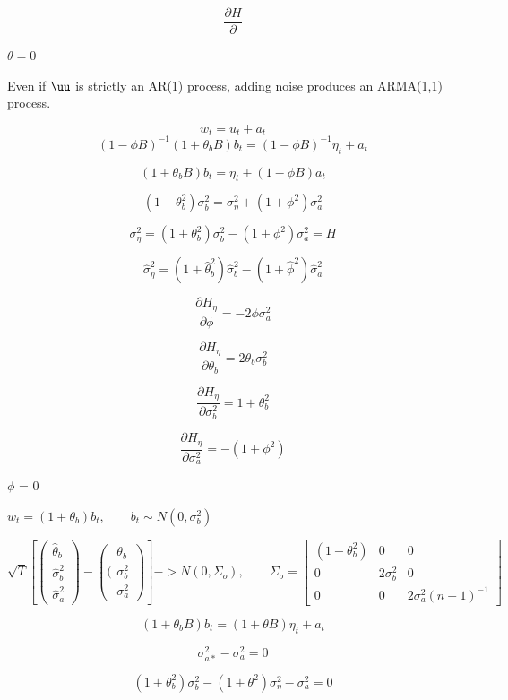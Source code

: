 $$\frac{\partial H}{\partial }$$


{$\theta = 0$}

Even if $\uu$ is strictly an AR(1) process, adding noise produces an ARMA(1,1) process. 

$$ w_t = u_t + a_t $$
$$ (1 - \phi B)^{-1}(1 + \theta_bB)b_t = (1 - \phi B)^{-1} \eta_t + a_t $$

$$ (1 + \theta_bB)b_t = \eta_t + (1 - \phi B)a_t $$

$$ (1 + \theta_b^2)\sigma_b^2 = \sigma_\eta^2 + (1 + \phi^2)\sigma_a^2 $$

$$ {\sigma}_\eta^2 = (1 + {\theta}_b^2){\sigma}_b^2 - (1 + {\phi}^2){\sigma}_a^2 = H $$

$$ \hat{\sigma}_\eta^2 = (1 + \hat{\theta}_b^2)\hat{\sigma}_b^2 - (1 + \hat{\phi}^2)\hat{\sigma}_a^2 $$

$$ \frac{\partial H_\eta}{\partial \phi} = -2\phi\sigma_a^2$$

$$ \frac{\partial H_\eta}{\partial \theta_b} = 2\theta_b\sigma_b^2$$

$$ \frac{\partial H_\eta}{\partial \sigma_b^2} = 1 + \theta_b^2$$

$$ \frac{\partial H_\eta}{\partial \sigma_a^2} = -(1 + \phi^2)$$

{$\phi$ = 0}

$w_t = (1 + \theta_b)b_t, \qquad b_t \sim N(0,\sigma_b^2)$

$$\sqrt{T}\left[\left(\begin{array}{c}
     \hat{\theta}_b \\
      \hat{\sigma}_b^2 \\
      \hat{\sigma}_a^2
\end{array}\right) - \left((\begin{array}{c}
    {\theta}_b \\
      {\sigma}_b^2 \\
     {\sigma}_a^2
\end{array}\right) \right] -> N(0,\Sigma_o),\qquad \Sigma_o = \left[\begin{array}{ccc}
    (1-\theta_b^2) & 0 & 0 \\
    0 & 2\sigma_b^2 & 0 \\
    0 & 0 & 2\sigma_a^2(n-1)^{-1}
\end{array}\right]$$

$$ (1 + \theta_bB)b_t = (1 + \theta B) \eta_t + a_t $$

$$\sigma_{a*}^2 - \sigma_a^2 = 0$$

$$ (1 + \theta_b^2)\sigma_b^2 - (1 + \theta^2)\sigma_\eta^2 - \sigma_a^2 = 0$$

